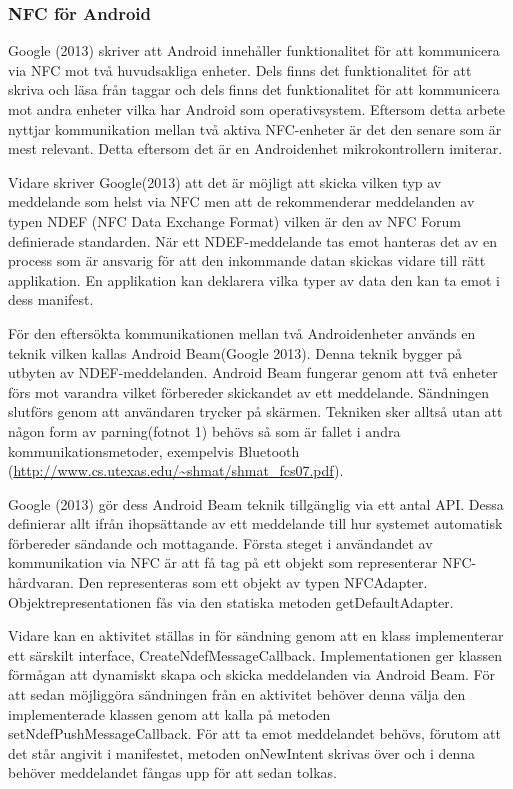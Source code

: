 \documentclass[11pt]{article}
\begin{document}
\subsubsection{NFC för Android}
Google (2013) skriver att Android innehåller funktionalitet för att kommunicera via NFC mot två huvudsakliga enheter. Dels finns det funktionalitet för att skriva och läsa från taggar och dels finns det funktionalitet för att kommunicera mot andra enheter vilka har Android som operativsystem. Eftersom detta arbete nyttjar kommunikation mellan två aktiva NFC-enheter är det den senare som är mest relevant. Detta eftersom det är en Androidenhet mikrokontrollern imiterar.

Vidare skriver Google(2013) att det är möjligt att skicka vilken typ av meddelande som helst via NFC men att de rekommenderar meddelanden av typen NDEF (NFC Data Exchange Format) vilken är den av NFC Forum definierade standarden. När ett NDEF-meddelande tas emot hanteras det av en process som är ansvarig för att den inkommande datan skickas vidare till rätt applikation. En applikation kan deklarera vilka typer av data den kan ta emot i dess manifest.

För den eftersökta kommunikationen mellan två Androidenheter används en teknik vilken kallas Android Beam(Google 2013). Denna teknik bygger på utbyten av NDEF-meddelanden. Android Beam fungerar genom att två enheter förs mot varandra vilket förbereder skickandet av ett meddelande. Sändningen slutförs genom att användaren trycker på skärmen. Tekniken sker alltså utan att någon form av parning(fotnot 1) behövs så som är fallet i andra kommunikationsmetoder, exempelvis Bluetooth (\url{http://www.cs.utexas.edu/~shmat/shmat_fcs07.pdf}).

Google (2013) gör dess Android Beam teknik tillgänglig via ett antal API. Dessa definierar allt ifrån ihopsättande av ett meddelande till hur systemet automatisk förbereder sändande och mottagande. Första steget i användandet av kommunikation via NFC är att få tag på ett objekt som representerar NFC-hårdvaran. Den representeras som ett objekt av typen NFCAdapter. Objektrepresentationen fås via den statiska metoden getDefaultAdapter.

Vidare kan en aktivitet ställas in för sändning genom att en klass implementerar ett särskilt interface, CreateNdefMessageCallback. Implementationen ger klassen förmågan att dynamiskt skapa och skicka meddelanden via Android Beam. För att sedan möjliggöra sändningen från en aktivitet behöver denna välja den implementerade klassen genom att kalla på metoden setNdefPushMessageCallback. För att ta emot meddelandet behövs, förutom att det står angivit i manifestet, metoden onNewIntent skrivas över och i denna behöver meddelandet fångas upp för att sedan tolkas.
\end{document}
